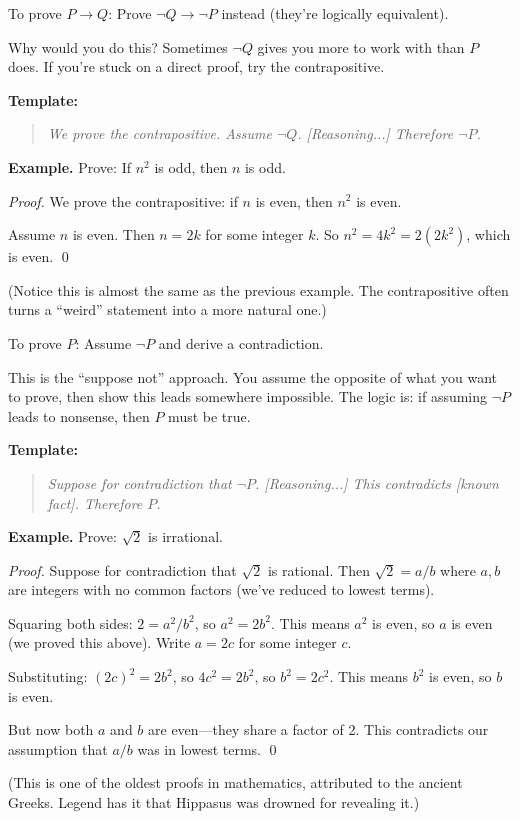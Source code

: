 \begin{strategy}
To prove $P \to Q$: Prove $\neg Q \to \neg P$ instead (they're logically equivalent).

Why would you do this? Sometimes $\neg Q$ gives you more to work with than $P$ does. If you're stuck on a direct proof, try the contrapositive.

\textbf{Template:}
\begin{quote}
\emph{We prove the contrapositive. Assume $\neg Q$. [Reasoning...] Therefore $\neg P$.}
\end{quote}

\textbf{Example.} Prove: If $n^2$ is odd, then $n$ is odd.

\emph{Proof.} We prove the contrapositive: if $n$ is even, then $n^2$ is even.

Assume $n$ is even. Then $n = 2k$ for some integer $k$. So $n^2 = 4k^2 = 2(2k^2)$, which is even. \qed

(Notice this is almost the same as the previous example. The contrapositive often turns a ``weird'' statement into a more natural one.)
\end{strategy}

\begin{strategy}
To prove $P$: Assume $\neg P$ and derive a contradiction.

This is the ``suppose not'' approach. You assume the opposite of what you want to prove, then show this leads somewhere impossible. The logic is: if assuming $\neg P$ leads to nonsense, then $P$ must be true.

\textbf{Template:}
\begin{quote}
\emph{Suppose for contradiction that $\neg P$. [Reasoning...] This contradicts [known fact]. Therefore $P$.}
\end{quote}

\textbf{Example.} Prove: $\sqrt{2}$ is irrational.

\emph{Proof.} Suppose for contradiction that $\sqrt{2}$ is rational. Then $\sqrt{2} = a/b$ where $a, b$ are integers with no common factors (we've reduced to lowest terms).

Squaring both sides: $2 = a^2/b^2$, so $a^2 = 2b^2$. This means $a^2$ is even, so $a$ is even (we proved this above). Write $a = 2c$ for some integer $c$.

Substituting: $(2c)^2 = 2b^2$, so $4c^2 = 2b^2$, so $b^2 = 2c^2$. This means $b^2$ is even, so $b$ is even.

But now both $a$ and $b$ are even---they share a factor of 2. This contradicts our assumption that $a/b$ was in lowest terms. \qed

(This is one of the oldest proofs in mathematics, attributed to the ancient Greeks. Legend has it that Hippasus was drowned for revealing it.)
\end{strategy}

